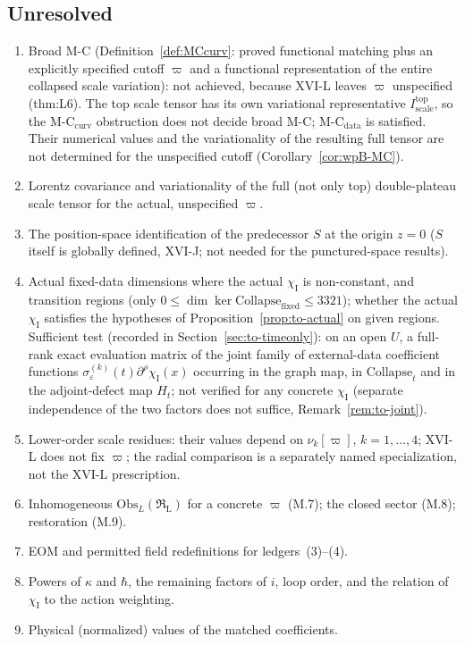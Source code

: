 \documentclass{article}
\theoremstyle{remark}
\newcommand{\RL}{\mathfrak R_{\mathrm L}}
\newcommand{\sigeps}{\sigma_\varepsilon}
\newcommand{\chiI}{\chi_{\mathrm I}}
\newcommand{\Coll}{\mathrm{Collapse}}
\begin{document}
\subsection{Unresolved}
\begin{enumerate}
\item Broad M-C (Definition~\ref{def:MCcurv}: proved functional matching plus an explicitly specified cutoff $\varpi$ and a functional representation of the entire collapsed scale variation): not achieved, because XVI-L leaves $\varpi$ unspecified (thm:L6). The top scale tensor has its own variational representative $I^{\mathrm{top}}_{\mathrm{scale}}$, so the M-C$_{\mathrm{curv}}$ obstruction does not decide broad M-C; M-C$_{\mathrm{data}}$ is satisfied. Their numerical values and the variationality of the resulting full tensor are not determined for the unspecified cutoff (Corollary~\ref{cor:wpB-MC}).
\item Lorentz covariance and variationality of the full (not only top) double-plateau scale tensor for the actual, unspecified $\varpi$.
\item The position-space identification of the predecessor $S$ at the origin $z=0$ ($S$ itself is globally defined, XVI-J; not needed for the punctured-space results).
\item Actual fixed-data dimensions where the actual $\chiI$ is non-constant, and transition regions (only $0\le\dim\ker\Coll_{\mathrm{fixed}}\le3321$); whether the actual $\chiI$ satisfies the hypotheses of Proposition~\ref{prop:to-actual} on given regions. Sufficient test (recorded in Section~\ref{sec:to-timeonly}): on an open $U$, a full-rank exact evaluation matrix of the joint family of external-data coefficient functions $\sigeps^{(k)}(t)\partial^\rho\chiI(x)$ occurring in the graph map, in $\Coll_t$ and in the adjoint-defect map $H_t$; not verified for any concrete $\chiI$ (separate independence of the two factors does not suffice, Remark~\ref{rem:to-joint}).
\item Lower-order scale residues: their values depend on $\nu_k[\varpi]$, $k=1,\dots,4$; XVI-L does not fix $\varpi$; the radial comparison is a separately named specialization, not the XVI-L prescription.
\item Inhomogeneous $\mathrm{Obs}_L(\RL)$ for a concrete $\varpi$ (M.7); the closed sector (M.8); restoration (M.9).
\item EOM and permitted field redefinitions for ledgers~(3)--(4).
\item Powers of $\kappa$ and $\hbar$, the remaining factors of $i$, loop order, and the relation of $\chiI$ to the action weighting.
\item Physical (normalized) values of the matched coefficients.
\end{enumerate}
\end{document}
